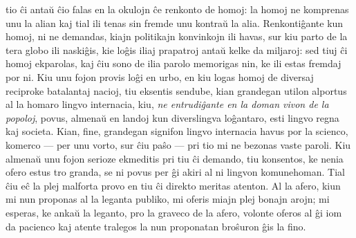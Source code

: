 tio \^ci anta\u u \^cio falas en la okulojn \^ce renkonto de homoj:
la homoj ne komprenas unu la alian kaj tial ili tenas sin fremde unu
kontra\u u la alia. Renkonti\^gante kun homoj, ni ne demandas, kiajn
politikajn konvinkojn ili havas, sur kiu parto de la tera globo ili
naski\^gis, kie lo\^gis iliaj prapatroj anta\u u kelke da miljaroj:
sed tiuj \^ci homoj ekparolas, kaj \^ciu sono de ilia parolo
memorigas nin, ke ili estas fremdaj por ni. Kiu unu fojon provis
lo\^gi en urbo, en kiu logas homoj de diversaj reciproke batalantaj
nacioj, tiu eksentis sendube, kian grandegan utilon alportus al la
homaro lingvo internacia, kiu, {\sl ne entrudi\^gante en la doman
vivon de la popoloj}, povus, almena\u u en landoj kun diverslingva
lo\^gantaro, esti lingvo regna kaj societa. Kian, fine, grandegan
signifon lingvo internacia havus por la scienco, komerco --- per unu
vorto, sur \^ciu pa\^so --- pri tio mi ne bezonas vaste paroli. Kiu
almena\u u unu fojon serioze ekmeditis pri tiu \^ci demando, tiu
konsentos, ke nenia ofero estus tro granda, se ni povus per \^gi
akiri al ni lingvon komunehoman. Tial \^ciu e\^c la plej malforta
provo en tiu \^ci direkto meritas atenton. Al la afero, kiun mi nun
proponas al la leganta publiko, mi oferis miajn plej bonajn arojn;
mi esperas, ke anka\u u la leganto, pro la graveco de la afero,
volonte oferos al \^gi iom da pacienco kaj atente tralegos la nun
proponatan bro\^suron \^gis la fino.

